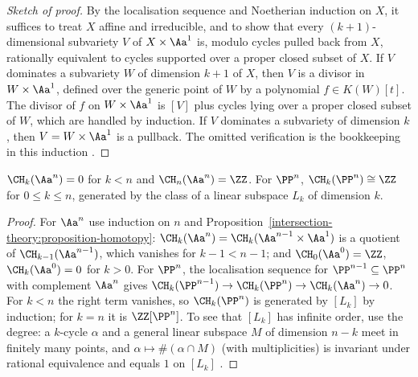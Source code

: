 \begin{proof}[Sketch of proof]
By the localisation sequence and Noetherian induction on $X$, it suffices to treat $X$ affine and irreducible, and to show that every $(k+1)$-dimensional subvariety $V$ of
$X \times \Aa^1$ is, modulo cycles pulled back from $X$, rationally equivalent to cycles supported over a proper closed subset of $X$. If $V$ dominates a subvariety $W$ of dimension $k + 1$
of $X$, then $V$ is a divisor in $W \times \Aa^1$, defined over the generic point of $W$ by a polynomial $f \in K(W)[t]$. The divisor of $f$ on $W \times \Aa^1$ is $[V]$ plus cycles lying over
a proper closed subset of $W$, which are handled by induction. If $V$ dominates a subvariety of dimension $k$, then $V = W \times \Aa^1$ is a pullback. The omitted verification is the
bookkeeping in this induction \cite[Proposition 1.9 and Theorem 3.3]{fulton-intersection}.
\end{proof}

\begin{theorem}\label{intersection-theory:theorem-chow-projective-space}
$\CH_k(\Aa^n) = 0$ for $k < n$ and $\CH_n(\Aa^n) = \ZZ$. For $\PP^n$, $\CH_k(\PP^n) \cong \ZZ$ for $0 \leq k \leq n$, generated by the class of a linear subspace $L_k$ of dimension $k$.
\end{theorem}

\begin{proof}
For $\Aa^n$ use induction on $n$ and Proposition~\ref{intersection-theory:proposition-homotopy}: $\CH_k(\Aa^n) = \CH_k(\Aa^{n-1} \times \Aa^1)$ is a quotient of
$\CH_{k-1}(\Aa^{n-1})$, which vanishes for $k - 1 < n - 1$; and $\CH_0(\Aa^0) = \ZZ$, $\CH_k(\Aa^0) = 0$ for $k > 0$. For $\PP^n$, the localisation sequence for
$\PP^{n-1} \subseteq \PP^n$ with complement $\Aa^n$ gives $\CH_k(\PP^{n-1}) \to \CH_k(\PP^n) \to \CH_k(\Aa^n) \to 0$. For $k < n$ the right term vanishes, so $\CH_k(\PP^n)$ is generated by
$[L_k]$ by induction; for $k = n$ it is $\ZZ[\PP^n]$. To see that $[L_k]$ has infinite order, use the degree: a $k$-cycle $\alpha$ and a general linear subspace $M$ of dimension $n - k$ meet in
finitely many points, and $\alpha \mapsto \#(\alpha \cap M)$ (with multiplicities) is invariant under rational equivalence and equals $1$ on $[L_k]$
\cite[Chapter 1]{fulton-intersection}.
\end{proof}


